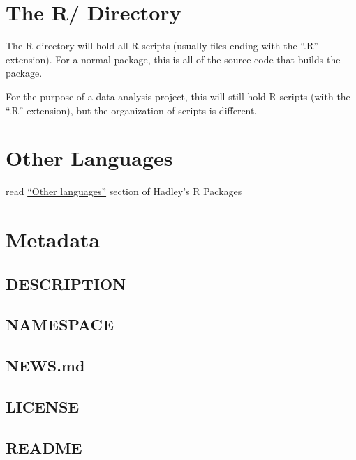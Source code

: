 \documentclass[]{book}
\begin{document}
\hypertarget{the-r-directory}{%
\section{The R/ Directory}\label{the-r-directory}}

The R directory will hold all R scripts (usually files ending with the ``.R'' extension). For a normal package, this is all of the source code that builds the package.

For the purpose of a data analysis project, this will still hold R scripts (with the ``.R'' extension), but the organization of scripts is different.

\hypertarget{other-languages}{%
\section{Other Languages}\label{other-languages}}

read \href{https://r-pkgs.org/inst.html\#inst-other-langs}{``Other languages''} section of Hadley's R Packages

\hypertarget{metadata}{%
\section{Metadata}\label{metadata}}

\hypertarget{description}{%
\subsection{DESCRIPTION}\label{description}}

\hypertarget{namespace}{%
\subsection{NAMESPACE}\label{namespace}}

\hypertarget{news.md}{%
\subsection{NEWS.md}\label{news.md}}

\hypertarget{license-1}{%
\subsection{LICENSE}\label{license-1}}

\hypertarget{readme}{%
\subsection{README}\label{readme}}
\end{document}
